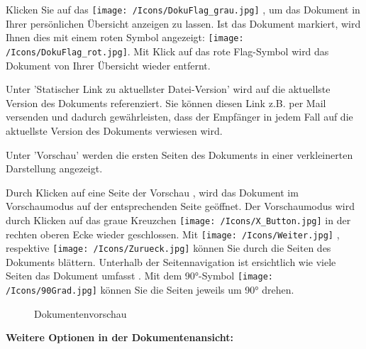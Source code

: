 Klicken Sie auf das \texttt{[image: /Icons/DokuFlag\_grau.jpg]} , um das Dokument in Ihrer persönlichen Übersicht anzeigen zu lassen. Ist das Dokument markiert, wird Ihnen dies mit einem roten Symbol angezeigt: \texttt{[image: /Icons/DokuFlag\_rot.jpg]}. Mit Klick auf das rote Flag-Symbol wird das Dokument von Ihrer Übersicht wieder entfernt. \newline

Unter 'Statischer Link zu aktuellster Datei-Version'  wird auf die aktuellste Version des Dokuments referenziert. Sie können diesen Link z.B. per Mail versenden und dadurch gewährleisten, dass der Empfänger in jedem Fall auf die aktuellste Version des Dokuments verwiesen wird.

Unter 'Vorschau'  werden die ersten Seiten des Dokuments in einer verkleinerten Darstellung angezeigt.

\vspace{\baselineskip}

Durch Klicken auf eine Seite der Vorschau , wird das Dokument im Vorschaumodus auf der entsprechenden Seite geöffnet. Der Vorschaumodus wird durch Klicken auf das graue Kreuzchen \texttt{[image: /Icons/X\_Button.jpg]}  in der rechten oberen Ecke wieder geschlossen. Mit \texttt{[image: /Icons/Weiter.jpg]} , respektive \texttt{[image: /Icons/Zurueck.jpg]}  können Sie durch die Seiten des Dokuments blättern. Unterhalb der Seitennavigation ist ersichtlich wie viele Seiten das Dokument umfasst . Mit dem 90°-Symbol \texttt{[image: /Icons/90Grad.jpg]}  können Sie die Seiten jeweils um 90° drehen.

\begin{figure}[H]
\caption{Dokumentenvorschau}
\end{figure}

\textbf{Weitere Optionen in der Dokumentenansicht:}

\vspace{\baselineskip}

